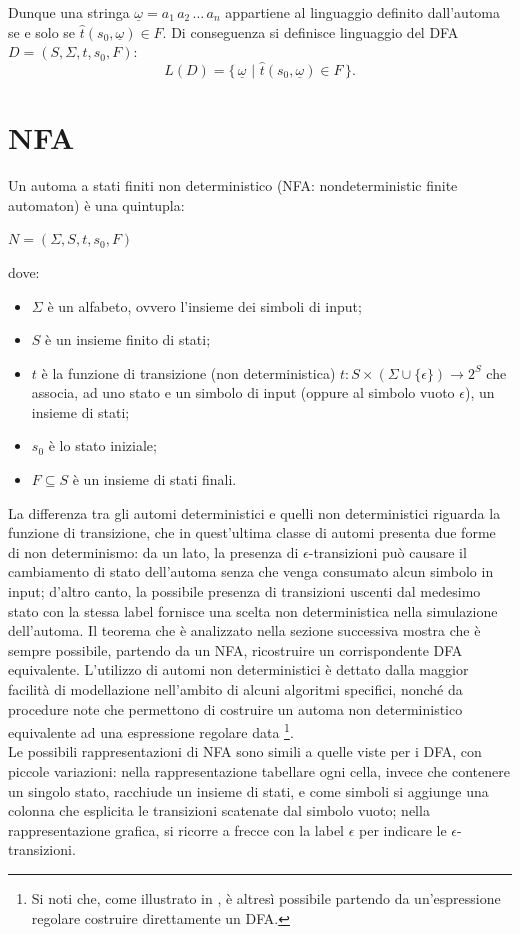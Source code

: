 Dunque una stringa $\underline \omega = a_1\, a_2\,\dots\,a_n$ appartiene al linguaggio definito dall'automa se e solo se $\hat t(s_0, \underline \omega) \in F$.
Di conseguenza si definisce linguaggio del DFA $D = (S,\Sigma, t, s_0, F)$:
$$
L(D) = \{\,\underline \omega\,\,|\,\,\hat t(s_0, \underline \omega) \in F\,\}.
$$

\newpage
\section{NFA}
Un automa a stati finiti non deterministico (NFA: nondeterministic finite automaton) è una quintupla:
\begin{center}
	$N = (\Sigma,S,t,s_0,F)$
\end{center}
dove:
\begin{itemize}
\item $\Sigma$ è un alfabeto, ovvero l'insieme dei simboli di input;
\item $S$ è un insieme finito di stati;
\item $t$ è la funzione di transizione (non deterministica) $t: S \times (\Sigma \cup \{\epsilon\}) \rightarrow 2^S$ che associa, ad uno stato e un simbolo di input (oppure al simbolo vuoto $\epsilon$), un insieme di stati;
\item $s_0$ è lo stato iniziale;
\item $F \subseteq S$ è un insieme di stati finali.
\end{itemize}
La differenza tra gli automi deterministici e quelli non deterministici riguarda la funzione di transizione, che in quest'ultima classe di automi presenta due forme di non determinismo: da un lato, la presenza di $\epsilon$-transizioni può causare il cambiamento di stato dell'automa senza che venga consumato alcun simbolo in input; d'altro canto, la possibile presenza di transizioni uscenti dal medesimo stato con la stessa label fornisce una scelta non deterministica nella simulazione dell'automa.
Il teorema che è analizzato nella sezione successiva mostra che è sempre possibile, partendo da un NFA, ricostruire un corrispondente DFA equivalente.
L'utilizzo di automi non deterministici è dettato dalla maggior facilità di modellazione nell'ambito di alcuni algoritmi specifici, nonché da procedure note che permettono di costruire un automa non deterministico equivalente ad una espressione regolare data \footnote{Si noti che, come illustrato in \cite{book:compilers}, è altresì possibile partendo da un'espressione regolare costruire direttamente un DFA.}.\\
Le possibili rappresentazioni di NFA sono simili a quelle viste per i DFA, con piccole variazioni: nella rappresentazione tabellare ogni cella, invece che contenere un singolo stato, racchiude un insieme di stati, e come simboli si aggiunge una colonna che esplicita le transizioni scatenate dal simbolo vuoto; nella rappresentazione grafica, si ricorre a frecce con la label $\epsilon$ per indicare le $\epsilon$-transizioni.

